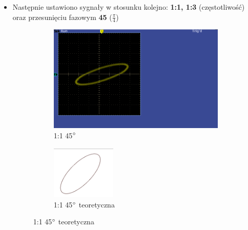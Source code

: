 \begin{itemize}
    \item Następnie ustawiono sygnały w stosunku kolejno: \textbf{1:1, 1:3} (częstotliwość) oraz przesunięciu fazowym \textbf{45}\boldsymbol{\degree} ($\frac{\pi}{4}$)
{
    \begin{figure}[H]
        \centering
        \begin{subfigure}[h]{0.45\textwidth}
            \includegraphics[scale=0.3]{images/zad.5.2.png}
            \caption*{1:1 45$\degree$}
        \end{subfigure}
        \begin{subfigure}[h]{0.45\textwidth}
            \includegraphics[scale=1.9]{images/theoretical/1-1-45.png}
            \caption*{1:1 45$\degree$ teoretyczna}
        \end{subfigure}
    \end{figure}
    
}
\end{itemize}
